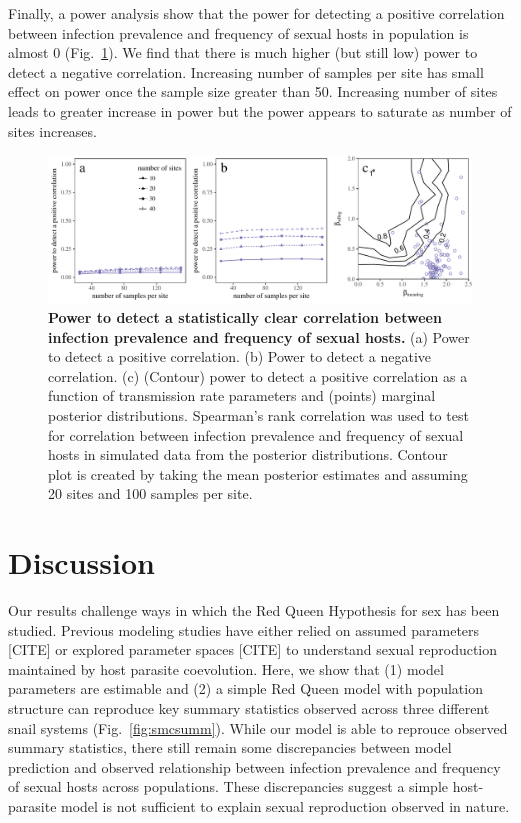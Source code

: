 \documentclass{article}\usepackage[]{graphicx}\usepackage[]{color}
\newcommand{\fref}[1]{Fig.~\ref{fig:#1}}
\begin{document}
Finally, a power analysis show that the power for detecting a positive correlation between infection prevalence and frequency of sexual hosts in \cite{vergara2014infection} population is almost 0 (\fref{power}).
We find that there is much higher (but still low) power to detect a negative correlation.
Increasing number of samples per site has small effect on power once the sample size greater than 50.
Increasing number of sites leads to greater increase in power but the power appears to saturate as number of sites increases.

\begin{figure}[!ht]
\includegraphics[width=\textwidth]{../fig/power.pdf}
\caption{{\bf Power to detect a statistically clear correlation between infection prevalence and frequency of sexual hosts.}
(a) Power to detect a positive correlation. 
(b) Power to detect a negative correlation. 
(c) (Contour) power to detect a positive correlation as a function of transmission rate parameters and (points) marginal posterior distributions.
Spearman's rank correlation was used to test for correlation between infection prevalence and frequency of sexual hosts in simulated data from the posterior distributions.
Contour plot is created by taking the mean posterior estimates and assuming 20 sites and 100 samples per site.
}
\label{fig:power}
\end{figure}

\section{Discussion}

Our results challenge ways in which the Red Queen Hypothesis for sex has been studied.
Previous modeling studies have either relied on assumed parameters [CITE] or explored parameter spaces [CITE]
to understand sexual reproduction maintained by host parasite coevolution.
Here, we show that (1) model parameters are estimable and (2) a simple Red Queen model with population structure can reproduce key summary statistics observed across three different snail systems (\fref{smcsumm}).
While our model is able to reprouce observed summary statistics, there still remain some discrepancies between model prediction and observed relationship between infection prevalence and frequency of sexual hosts across populations.
These discrepancies suggest a simple host-parasite model is not sufficient to explain sexual reproduction observed in nature.
\end{document}
